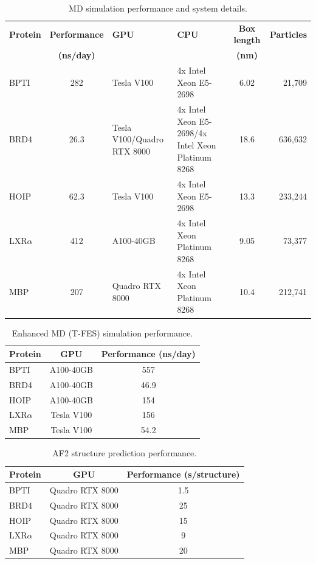 \begin{table}[htbp]
    \centering
    \small
    \begin{tabularx}{\textwidth}{@{}lc>{\raggedright\arraybackslash}X>{\raggedright\arraybackslash}Xcr@{}}
    \toprule
        \textbf{Protein} & \textbf{Performance} & \textbf{GPU} & \textbf{CPU} & \textbf{Box length} & \textbf{Particles} \\
        & \textbf{(ns/day)} & & & \textbf{(nm)} & \\
        \midrule
        BPTI & 282 & Tesla V100 & 4x Intel Xeon E5-2698 & 6.02 & 21,709 \\
        BRD4 & 26.3 & Tesla V100/Quadro RTX 8000 & 4x Intel Xeon E5-2698/4x Intel Xeon Platinum 8268 & 18.6 & 636,632 \\
        HOIP & 62.3 & Tesla V100 & 4x Intel Xeon E5-2698 & 13.3 & 233,244 \\
        LXR$\alpha$ & 412 & A100-40GB & 4x Intel Xeon Platinum 8268 & 9.05 & 73,377 \\
        MBP & 207 & Quadro RTX 8000 & 4x Intel Xeon Platinum 8268 & 10.4 & 212,741 \\
        \bottomrule
    \end{tabularx}
    \caption{MD simulation performance and system details.}
    \label{tab:valdx-md-performance}
\end{table}

\begin{table}[htbp]
    \centering
    \small
    \begin{tabular}{@{}lcc@{}}
    \toprule
        \textbf{Protein} & \textbf{GPU} & \textbf{Performance (ns/day)} \\
        \midrule
        BPTI & A100-40GB & 557 \\
        BRD4 & A100-40GB & 46.9 \\
        HOIP & A100-40GB & 154 \\
        LXR$\alpha$ & Tesla V100 & 156 \\
        MBP & Tesla V100 & 54.2 \\
        \bottomrule
    \end{tabular}
    \caption{Enhanced MD (T-FES) simulation performance.}
    \label{tab:valdx-tfes-performance}
\end{table}

\begin{table}[htbp]
    \centering
    \small
    \begin{tabular}{@{}lcc@{}}
    \toprule
        \textbf{Protein} & \textbf{GPU} & \textbf{Performance (s/structure)} \\
        \midrule
        BPTI & Quadro RTX 8000 & 1.5 \\
        BRD4 & Quadro RTX 8000 & 25 \\
        HOIP & Quadro RTX 8000 & 15 \\
        LXR$\alpha$ & Quadro RTX 8000 & 9 \\
        MBP & Quadro RTX 8000 & 20 \\
        \bottomrule
    \end{tabular}
    \caption{AF2 structure prediction performance.}
    \label{tab:valdx-af2-performance}
\end{table}

